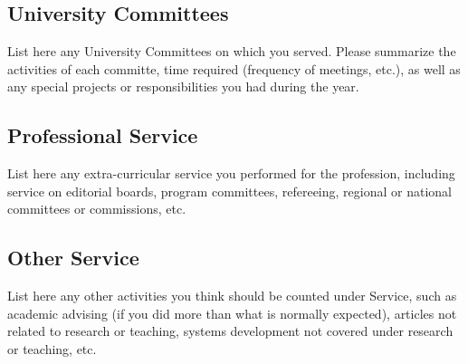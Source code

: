 \subsection{University Committees}

List here any University Committees on which you served.  Please summarize
the activities of each committe, time required (frequency of meetings,
etc.), as well as any special projects or responsibilities you had during
the year.

\subsection{Professional Service}

List here any extra-curricular service you performed for the profession,
including service on editorial boards, program committees, refereeing,
regional or national committees or commissions, etc.

\subsection{Other Service}

List here any other activities you think should be counted under Service, such
as academic advising (if you did more than what is normally expected),
articles not related to research or teaching, systems development not covered
under research or teaching, etc.





